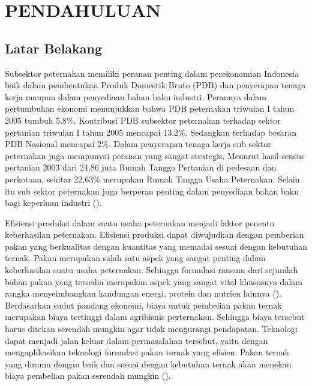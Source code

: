 
\section*{PENDAHULUAN} %

\subsection*{Latar Belakang}
Subsektor peternakan memiliki peranan penting dalam perekonomian Indonesia baik dalam pembentukan Produk Domestik Bruto (PDB) dan penyerapan tenaga kerja maupun dalam penyediaan bahan baku industri. Perannya dalam pertumbuhan ekonomi menunjukkan bahwa PDB peternakan triwulan I tahun 2005 tumbuh 5.8\%. Kontribusi PDB subsektor peternakan terhadap sektor pertanian triwulan I tahun 2005 mencapai 13.2\%. Sedangkan terhadap besaran PDB Nasional mencapai 2\%. Dalam penyerapan tenaga kerja sub sektor peternakan juga mempunyai peranan yang sangat strategis. Menurut hasil sensus pertanian 2003 dari 24,86 juta Rumah Tangga Pertanian di pedesaan dan perkotaan, sekitar 22,63\% merupakan Rumah Tangga Usaha Peternakan. Selain itu sub sektor peternakan juga berperan penting dalam penyediaan bahan baku bagi keperluan industri (\cite{Makka2012}). 

Efisiensi produksi dalam suatu usaha peternakan menjadi faktor penentu keberhasilan peternakan. Efisiensi produksi dapat diwujudkan dengan pemberian pakan yang berkualitas dengan kuantitas yang memadai sesuai dengan kebutuhan ternak. Pakan merupakan salah satu aspek yang sangat penting dalam keberhasilan suatu usaha peternakan. Sehingga formulasi ransum dari sejumlah bahan pakan yang tersedia merupakan aspek yang sangat vital khususnya dalam rangka menyeimbangkan kandungan energi, protein dan nutrien lainnya (\cite{Jayanegara2014}). Berdasarkan sudut pandang ekonomi, biaya untuk pembelian pakan ternak merupakan biaya tertinggi dalam agribisnis perternakan. Sehingga biaya tersebut harus ditekan serendah mungkin agar tidak mengurangi pendapatan. Teknologi dapat menjadi jalan keluar dalam permasalahan tersebut, yaitu dengan mengaplikasikan teknologi formulasi pakan ternak yang efisien. Pakan ternak yang diramu dengan baik dan sesuai dengan kebutuhan ternak akan menekan biaya pembelian pakan serendah mungkin (\cite{Shiddieqy2010}). 

